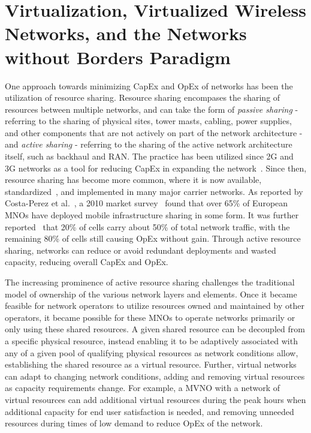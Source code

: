 \documentclass[12pt,dvipsnames]{report}
\begin{document}
\section{Virtualization, Virtualized Wireless Networks, and the Networks without Borders Paradigm} \label{sec:virtualization}

One approach towards minimizing CapEx and OpEx of networks has been the utilization of resource sharing.  Resource sharing encompases the sharing of resources between multiple networks, and can take the form of \emph{passive sharing} - referring to the sharing of physical sites, tower masts, cabling, power supplies, and other components that are not actively on part of the network architecture - and \emph{active sharing} - referring to the sharing of the active network architecture itself, such as backhaul and RAN.  The practice has been utilized since 2G and 3G networks as a tool for reducing CapEx in expanding the network~\cite{1421931}.  Since then, resource sharing has become more common, where it is now available, standardized~\cite{3GPP_TS_23.251}, and implemented in many major carrier networks.  As reported by Costa-Perez et al.~\cite{6553675}, a 2010 market survey~\cite{NetSharingReport} found that over 65\% of European MNOs have deployed mobile infrastructure sharing in some form.  It was further reported~\cite{6553675} that 20\% of cells carry about 50\% of total network traffic, with the remaining 80\% of cells still causing OpEx without gain.  Through active resource sharing, networks can reduce or avoid redundant deployments and wasted capacity, reducing overall CapEx and OpEx.

The increasing prominence of active resource sharing challenges the traditional model of ownership of the various network layers and elements.  Once it became feasible for network operators to utilize resources owned and maintained by other operators, it became possible for these MNOs to operate networks primarily or only using these shared resources.  A given shared resource can be decoupled from a specific physical resource, instead enabling it to be adaptively associated with any of a given pool of qualifying physical resources as network conditions allow, establishing the shared resource as a virtual resource.  Further, virtual networks can adapt to changing network conditions, adding and removing virtual resources as capacity requirements change.  For example, a MVNO with a network of virtual resources can add additional virtual resources during the peak hours when additional capacity for end user satisfaction is needed, and removing unneeded resources during times of low demand to reduce OpEx of the network.
\end{document}
